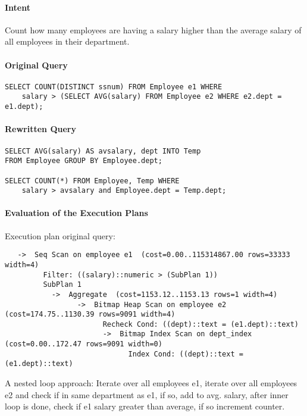 \documentclass[11pt]{scrartcl}
\begin{document}
\paragraph{Intent}

Count how many employees are having a salary higher than the average
salary of all employees in their department.

\paragraph{Original Query}

{\small
\begin{verbatim}
SELECT COUNT(DISTINCT ssnum) FROM Employee e1 WHERE
    salary > (SELECT AVG(salary) FROM Employee e2 WHERE e2.dept = e1.dept);
\end{verbatim}
}

\paragraph{Rewritten Query}

{\small
\begin{verbatim}
SELECT AVG(salary) AS avsalary, dept INTO Temp
FROM Employee GROUP BY Employee.dept;

SELECT COUNT(*) FROM Employee, Temp WHERE
    salary > avsalary and Employee.dept = Temp.dept;
\end{verbatim}
}

\paragraph{Evaluation of the Execution Plans}

Execution plan original query:

\begin{verbatim}
   ->  Seq Scan on employee e1  (cost=0.00..115314867.00 rows=33333 width=4)
         Filter: ((salary)::numeric > (SubPlan 1))
         SubPlan 1
           ->  Aggregate  (cost=1153.12..1153.13 rows=1 width=4)
                 ->  Bitmap Heap Scan on employee e2  (cost=174.75..1130.39 rows=9091 width=4)
                       Recheck Cond: ((dept)::text = (e1.dept)::text)
                       ->  Bitmap Index Scan on dept_index  (cost=0.00..172.47 rows=9091 width=0)
                             Index Cond: ((dept)::text = (e1.dept)::text)
\end{verbatim}

A nested loop approach: Iterate over all employees e1, iterate over all
employees e2 and check if in same department as e1, if so, add to avg. salary,
after inner loop is done, check if e1 salary greater than average, if so increment counter.
\end{document}
